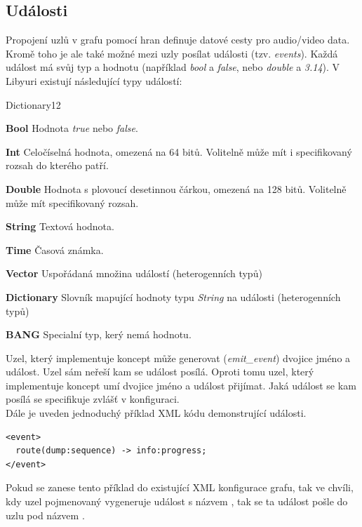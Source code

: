 \documentclass[thesis=M,czech]{FITthesis}[2012/06/26]
\begin{document}
\subsection{Události} \label{subsec:analyza_yuri_udalosti}
Propojení uzlů v grafu pomocí hran definuje datové cesty pro audio/video data. Kromě toho je ale také možné mezi uzly posílat události (tzv. \textit{events}). Každá událost má svůj typ a hodnotu (například \textit{bool} a \textit{false}, nebo \textit{double} a \textit{3.14}). V Libyuri existují následující typy událostí:

\begin{labeling}{Dictionary12}
\item [\textbf{Bool}] Hodnota \textit{true} nebo \textit{false}.
\item [\textbf{Int}] Celočíselná hodnota, omezená na 64 bitů. Volitelně může mít i specifikovaný rozsah do kterého patří.
\item [\textbf{Double}] Hodnota s plovoucí desetinnou čárkou, omezená na 128 bitů. Volitelně může mít specifikovaný rozsah.
\item [\textbf{String}] Textová hodnota.
\item [\textbf{Time}] Časová známka.
\item [\textbf{Vector}] Uspořádaná množina událostí (heterogenních typů)
\item [\textbf{Dictionary}] Slovník mapující hodnoty typu \textit{String} na události (heterogenních typů)
\item [\textbf{BANG}] Specialní typ, kerý nemá hodnotu.
\end{labeling}

Uzel, který implementuje koncept  může generovat (\textit{emit\_event}) dvojice jméno a událost. Uzel sám neřeší kam se událost posílá. Oproti tomu uzel, který implementuje koncept  umí dvojice jméno a událost přijímat. Jaká událost se kam posílá se specifikuje zvlášť v konfiguraci.\\

Dále je uveden jednoduchý příklad XML kódu demonstrující události.
\\
\lstset{language=XML}
\begin{lstlisting}
<event>
  route(dump:sequence) -> info:progress;
</event>
\end{lstlisting}

Pokud se zanese tento příklad do existující XML konfigurace grafu, tak ve chvíli, kdy uzel pojmenovaný  vygeneruje událost s názvem , tak se ta událost pošle do uzlu  pod názvem .
\end{document}

